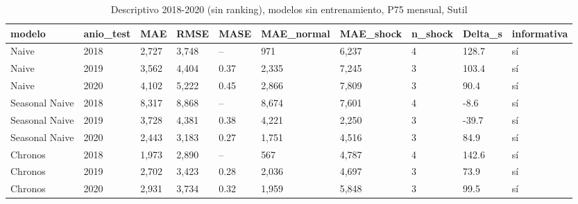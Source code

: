 \begin{table}[H]
\centering
\small
\caption{Descriptivo 2018-2020 (sin ranking), modelos sin entrenamiento, P75 mensual, Sutil}
\label{tab:T17_descriptivo_2018_2020_sutil}
\begin{tabular}{llllllllll}
\toprule
modelo & anio\_test & MAE & RMSE & MASE & MAE\_normal & MAE\_shock & n\_shock & Delta\_s & informativa \\
\midrule
Naive & 2018 & 2,727 & 3,748 & -- & 971 & 6,237 & 4 & 128.7 & sí \\
Naive & 2019 & 3,562 & 4,404 & 0.37 & 2,335 & 7,245 & 3 & 103.4 & sí \\
Naive & 2020 & 4,102 & 5,222 & 0.45 & 2,866 & 7,809 & 3 & 90.4 & sí \\
Seasonal Naive & 2018 & 8,317 & 8,868 & -- & 8,674 & 7,601 & 4 & -8.6 & sí \\
Seasonal Naive & 2019 & 3,728 & 4,381 & 0.38 & 4,221 & 2,250 & 3 & -39.7 & sí \\
Seasonal Naive & 2020 & 2,443 & 3,183 & 0.27 & 1,751 & 4,516 & 3 & 84.9 & sí \\
Chronos & 2018 & 1,973 & 2,890 & -- & 567 & 4,787 & 4 & 142.6 & sí \\
Chronos & 2019 & 2,702 & 3,423 & 0.28 & 2,036 & 4,697 & 3 & 73.9 & sí \\
Chronos & 2020 & 2,931 & 3,734 & 0.32 & 1,959 & 5,848 & 3 & 99.5 & sí \\
\bottomrule
\end{tabular}
\end{table}